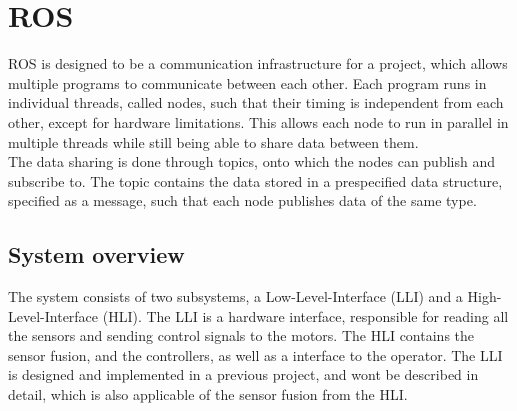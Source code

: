 \section{ROS}
ROS is designed to be a communication infrastructure for a project, which allows multiple programs to communicate between each other. 
Each program runs in individual threads, called nodes, such that their timing is independent from each other, except for hardware limitations.  
This allows each node to run in parallel in multiple threads while still being able to share data between them.\\
The data sharing is done through topics, onto which the nodes can publish and subscribe to. 
The topic contains the data stored in a prespecified data structure, specified as a message, such that each node publishes data of the same type. 
\subsection{System overview}
The system consists of two subsystems, a Low-Level-Interface (LLI) and a High-Level-Interface (HLI). 
The LLI is a hardware interface, responsible for reading all the sensors and sending control signals to the motors.
The HLI contains the sensor fusion, and the controllers, as well as a interface to the operator. 
The LLI is designed and implemented in a previous project, and wont be described in detail, which is also applicable of the sensor fusion from the HLI.

